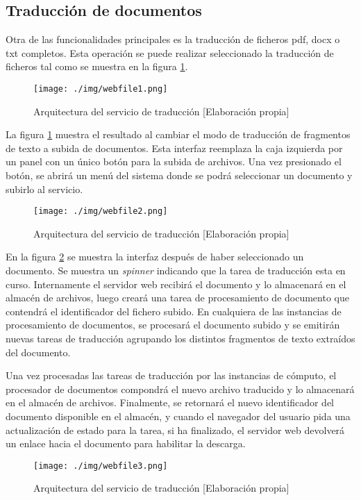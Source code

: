 \subsection{Traducción de documentos}
Otra de las funcionalidades principales es la traducción de ficheros pdf, docx o txt completos. Esta operación se puede realizar seleccionado la traducción de ficheros tal como se muestra en la figura \ref{webfile1}.
\begin{figure}[H]
    \centering
    \texttt{[image: ./img/webfile1.png]}
    \caption{Arquitectura del servicio de traducción [Elaboración propia]}\label{webfile1}
\end{figure}

La figura \ref{webfile1} muestra el resultado al cambiar el modo de traducción de fragmentos de texto a subida de documentos. Esta interfaz reemplaza la caja izquierda por un panel con un único botón para la subida de archivos.
Una vez presionado el botón, se abrirá un menú del sistema donde se podrá seleccionar un documento y subirlo al servicio.

\begin{figure}[H]
    \centering
    \texttt{[image: ./img/webfile2.png]}
    \caption{Arquitectura del servicio de traducción [Elaboración propia]}\label{webfile2}
\end{figure}

En la figura \ref{webfile2} se muestra la interfaz después de haber seleccionado un documento. Se muestra un \textit{spinner} indicando que la tarea de traducción esta en curso. Internamente el servidor web recibirá el documento y lo almacenará en el almacén de archivos, luego creará una tarea de procesamiento de documento que contendrá el identificador del fichero subido. En cualquiera de las instancias de procesamiento de documentos, se procesará el documento subido y se emitirán nuevas tareas de traducción agrupando los distintos fragmentos de texto extraídos del documento.

Una vez procesadas las tareas de traducción por las instancias de cómputo, el procesador de documentos compondrá el nuevo archivo traducido y lo almacenará en el almacén de archivos. Finalmente, se retornará el nuevo identificador del documento disponible en el almacén, y cuando el navegador del usuario pida una actualización de estado para la tarea, si ha finalizado, el servidor web devolverá un enlace hacia el documento para habilitar la descarga.

\begin{figure}[H]
    \centering
    \texttt{[image: ./img/webfile3.png]}
    \caption{Arquitectura del servicio de traducción [Elaboración propia]}\label{webfile3}
\end{figure}

